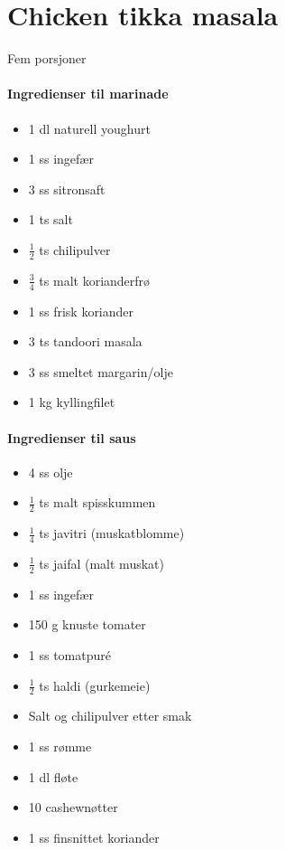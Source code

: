 \section{﻿Chicken tikka masala}
Fem porsjoner

\paragraph{Ingredienser til marinade}
\begin{itemize}[noitemsep]
	\item 1 dl naturell youghurt
	\item 1 ss ingefær
	\item 3 ss sitronsaft
	\item 1 ts salt
	\item $\frac{1}{2}$ ts chilipulver
	\item $\frac{3}{4}$ ts malt korianderfrø
	\item 1 ss frisk koriander
	\item 3 ts tandoori masala
	\item 3 ss smeltet margarin/olje
	\item 1 kg kyllingfilet
\end{itemize}

\paragraph{Ingredienser til saus}
\begin{itemize}[noitemsep]
	\item 4 ss olje
	\item  $\frac{1}{2}$ ts malt spisskummen
	\item $\frac{1}{4}$ ts javitri (muskatblomme)
	\item  $\frac{1}{2}$ ts jaifal (malt muskat)
	\item 1 ss ingefær
	\item 150 g knuste tomater
	\item 1 ss tomatpuré
	\item  $\frac{1}{2}$ ts haldi (gurkemeie)
	\item Salt og chilipulver etter smak
	\item 1 ss rømme
	\item 1 dl fløte
	\item 10 cashewnøtter
	\item 1 ss finsnittet koriander
\end{itemize}

